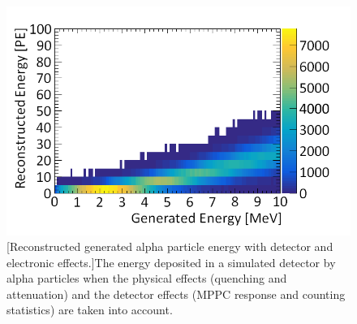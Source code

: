 \begin{figure}[!h]
 \centering
 \includegraphics[width=0.5\linewidth]{Chapter4/Figs/Raster/truth_vs_recoSummed_alpha_zoomMedTextNew.png}
 [Reconstructed generated alpha particle energy with detector and electronic effects.]{The energy deposited in a simulated detector by alpha particles when the physical effects (quenching and attenuation) and the detector effects (MPPC response and counting statistics) are taken into account.} 
 \label{fig:alphaRecoVsTruthZoom}
\end{figure}

\vspace{2cm}

